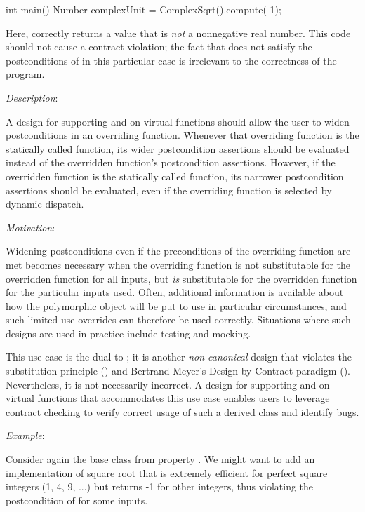 \begin{codeblock}
int main() {
  Number complexUnit = ComplexSqrt().compute(-1);
}
\end{codeblock}

Here,  correctly returns a value that is \emph{not} a nonnegative real number. This code should not cause a contract violation; the fact that  does not satisfy the postconditions of  in this particular case is irrelevant to the correctness of the program.


\emph{Description}:

A design for supporting  and  on virtual functions should allow the user to widen postconditions in an overriding function. Whenever that overriding function is the statically called function, its wider postcondition assertions should be evaluated instead of the overridden function's postcondition assertions. However, if the overridden function is the statically called function, its narrower postcondition assertions should be evaluated, even if the overriding function is selected by dynamic dispatch.

\emph{Motivation}:

Widening postconditions even if the preconditions of the overriding function are met becomes necessary when the overriding function is not substitutable for the overridden function for all inputs, but \emph{is} substitutable for the overridden function for the particular inputs used. Often, additional information is available about how the polymorphic object will be put to use in particular circumstances, and such limited-use overrides can therefore be used correctly. Situations where such designs are used in practice include testing and mocking. 

This use case is the dual to ; it is another \emph{non-canonical} design that violates the substitution principle () and Bertrand Meyer's Design by Contract paradigm (). Nevertheless, it is not necessarily incorrect. A design for supporting  and  on virtual functions that accommodates this use case enables users to leverage contract checking to verify correct usage of such a derived class and identify bugs.

\emph{Example}:

Consider again the base class  from property . We might want to add an implementation of square root  that is extremely efficient for perfect square integers (1, 4, 9, ...) but returns -1 for other integers, thus violating the postcondition of  for some inputs.

